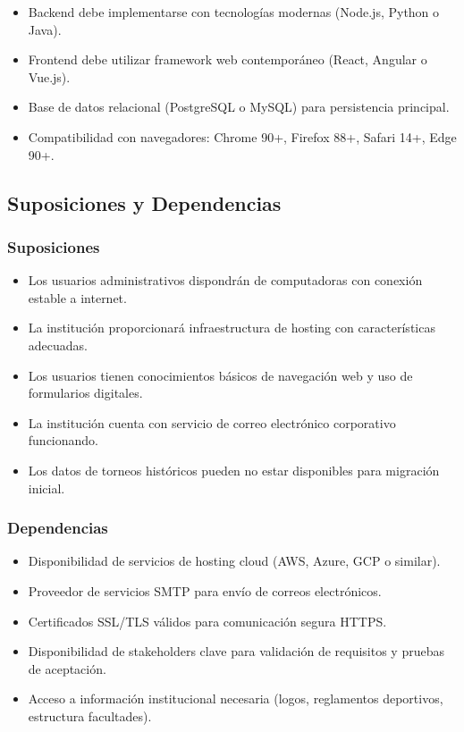 \documentclass[12pt,a4paper]{article}
\begin{document}
\begin{itemize}[noitemsep]
    \item Backend debe implementarse con tecnologías modernas (Node.js, Python o Java).
    \item Frontend debe utilizar framework web contemporáneo (React, Angular o Vue.js).
    \item Base de datos relacional (PostgreSQL o MySQL) para persistencia principal.
    \item Compatibilidad con navegadores: Chrome 90+, Firefox 88+, Safari 14+, Edge 90+.
\end{itemize}

\subsection{Suposiciones y Dependencias}

\subsubsection{Suposiciones}

\begin{itemize}[noitemsep]
    \item Los usuarios administrativos dispondrán de computadoras con conexión estable a internet.
    \item La institución proporcionará infraestructura de hosting con características adecuadas.
    \item Los usuarios tienen conocimientos básicos de navegación web y uso de formularios digitales.
    \item La institución cuenta con servicio de correo electrónico corporativo funcionando.
    \item Los datos de torneos históricos pueden no estar disponibles para migración inicial.
\end{itemize}

\subsubsection{Dependencias}

\begin{itemize}[noitemsep]
    \item Disponibilidad de servicios de hosting cloud (AWS, Azure, GCP o similar).
    \item Proveedor de servicios SMTP para envío de correos electrónicos.
    \item Certificados SSL/TLS válidos para comunicación segura HTTPS.
    \item Disponibilidad de stakeholders clave para validación de requisitos y pruebas de aceptación.
    \item Acceso a información institucional necesaria (logos, reglamentos deportivos, estructura facultades).
\end{itemize}
\end{document}
